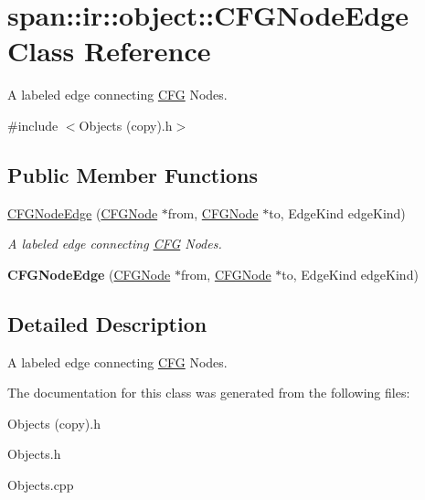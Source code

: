 \hypertarget{classspan_1_1ir_1_1object_1_1CFGNodeEdge}{}\section{span\+:\+:ir\+:\+:object\+:\+:C\+F\+G\+Node\+Edge Class Reference}
\label{classspan_1_1ir_1_1object_1_1CFGNodeEdge}


A labeled edge connecting \hyperlink{classspan_1_1ir_1_1object_1_1CFG}{C\+FG} Nodes.  




{\ttfamily \#include $<$Objects (copy).\+h$>$}

\subsection*{Public Member Functions}
\begin{DoxyCompactItemize}
\item 
\mbox{\label{classspan_1_1ir_1_1object_1_1CFGNodeEdge_a4a230b3c1e098ed536bbbbab0baaeabe}} 
\hyperlink{classspan_1_1ir_1_1object_1_1CFGNodeEdge_a4a230b3c1e098ed536bbbbab0baaeabe}{C\+F\+G\+Node\+Edge} (\hyperlink{classspan_1_1ir_1_1object_1_1CFGNode}{C\+F\+G\+Node} $\ast$from, \hyperlink{classspan_1_1ir_1_1object_1_1CFGNode}{C\+F\+G\+Node} $\ast$to, Edge\+Kind edge\+Kind)
\begin{DoxyCompactList}\small\item\em A labeled edge connecting \hyperlink{classspan_1_1ir_1_1object_1_1CFG}{C\+FG} Nodes. \end{DoxyCompactList}\item 
\mbox{\label{classspan_1_1ir_1_1object_1_1CFGNodeEdge_a031ba19564c2c855b6721ba57ff6c2f7}} 
{\bfseries C\+F\+G\+Node\+Edge} (\hyperlink{classspan_1_1ir_1_1object_1_1CFGNode}{C\+F\+G\+Node} $\ast$from, \hyperlink{classspan_1_1ir_1_1object_1_1CFGNode}{C\+F\+G\+Node} $\ast$to, Edge\+Kind edge\+Kind)
\end{DoxyCompactItemize}


\subsection{Detailed Description}
A labeled edge connecting \hyperlink{classspan_1_1ir_1_1object_1_1CFG}{C\+FG} Nodes. 

The documentation for this class was generated from the following files\+:\begin{DoxyCompactItemize}
\item 
Objects (copy).\+h\item 
Objects.\+h\item 
Objects.\+cpp\end{DoxyCompactItemize}
